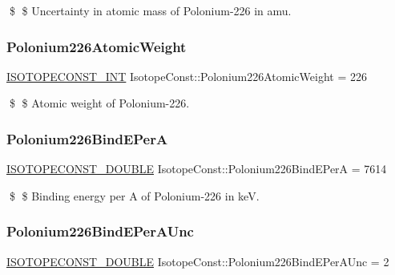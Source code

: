\$ \$ Uncertainty in atomic mass of Polonium-\/226 in amu. \mbox{\label{group___isotope_const-_polonium-_po226_ga824fabd57859d8807270a1e15046a0bf}} 
\subsubsection{\texorpdfstring{Polonium226\+Atomic\+Weight}{Polonium226AtomicWeight}}
{\footnotesize\ttfamily \mbox{\hyperlink{group___isotope_const-_macros_ga5f18360b3e99483a35c32d789e62621c}{I\+S\+O\+T\+O\+P\+E\+C\+O\+N\+S\+T\+\_\+\+I\+NT}} Isotope\+Const\+::\+Polonium226\+Atomic\+Weight = 226}

\$ \$ Atomic weight of Polonium-\/226. \mbox{\label{group___isotope_const-_polonium-_po226_gaf16391c20e5e590cba4cead6fb3308f4}} 
\subsubsection{\texorpdfstring{Polonium226\+Bind\+E\+PerA}{Polonium226BindEPerA}}
{\footnotesize\ttfamily \mbox{\hyperlink{group___isotope_const-_macros_ga8f45a7272ce02c0b4c65c44636ed719a}{I\+S\+O\+T\+O\+P\+E\+C\+O\+N\+S\+T\+\_\+\+D\+O\+U\+B\+LE}} Isotope\+Const\+::\+Polonium226\+Bind\+E\+PerA = 7614}

\$ \$ Binding energy per A of Polonium-\/226 in keV. \mbox{\label{group___isotope_const-_polonium-_po226_ga833b607e350cff2fc19b5d57a819eec6}} 
\subsubsection{\texorpdfstring{Polonium226\+Bind\+E\+Per\+A\+Unc}{Polonium226BindEPerAUnc}}
{\footnotesize\ttfamily \mbox{\hyperlink{group___isotope_const-_macros_ga8f45a7272ce02c0b4c65c44636ed719a}{I\+S\+O\+T\+O\+P\+E\+C\+O\+N\+S\+T\+\_\+\+D\+O\+U\+B\+LE}} Isotope\+Const\+::\+Polonium226\+Bind\+E\+Per\+A\+Unc = 2}

